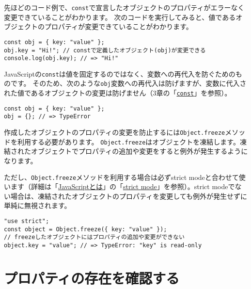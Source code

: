 \begin{tcolorbox}[enhanced jigsaw,breakable,title=constで定義したオブジェクトは変更可能]\label{const-and-object}

先ほどのコード例で、\texttt{const}で宣言したオブジェクトのプロパティがエラーなく変更できていることがわかります。
次のコードを実行してみると、値であるオブジェクトのプロパティが変更できていることがわかります。
\vspace{-1mm}
\begin{lstlisting}
const obj = { key: "value" };
obj.key = "Hi!"; // constで定義したオブジェクト(obj)が変更できる
console.log(obj.key); // => "Hi!"
\end{lstlisting}
\vspace{-1mm}
\enlargethispage{\baselineskip}JavaScriptの\texttt{const}は値を固定するのではなく、変数への再代入を防ぐためのものです。
そのため、次のような\texttt{obj}変数への再代入は防げますが、変数に代入された値であるオブジェクトの変更は防げません（3章の「\hyperlink{const}{\texttt{const}}」を参照）。
\vspace{-1mm}
\enlargethispage{\baselineskip}\begin{lstlisting}
const obj = { key: "value" };
obj = {}; // => TypeError
\end{lstlisting}

作成したオブジェクトのプロパティの変更を防止するには\texttt{Object.freeze}メソッドを利用する必要があります。
\texttt{Object.freeze}はオブジェクトを凍結します。凍結されたオブジェクトでプロパティの追加や変更をすると例外が発生するようになります。

ただし、\texttt{Object.freeze}メソッドを利用する場合は必ずstrict
modeと合わせて使います（詳細は「\hyperlink{what-is-javascript}{JavaScriptとは}」の「\hyperlink{strict-mode}{strict mode}」を参照）。strict
modeでない場合は、凍結されたオブジェクトのプロパティを変更しても例外が発生せずに単純に無視されます。

\begin{lstlisting}
"use strict";
const object = Object.freeze({ key: "value" });
// freezeしたオブジェクトにはプロパティの追加や変更ができない
object.key = "value"; // => TypeError: "key" is read-only
\end{lstlisting}
\end{tcolorbox}
\vspace{-3mm}
\hypertarget{confirm-property}{%
\section{プロパティの存在を確認する}\label{confirm-property}}

